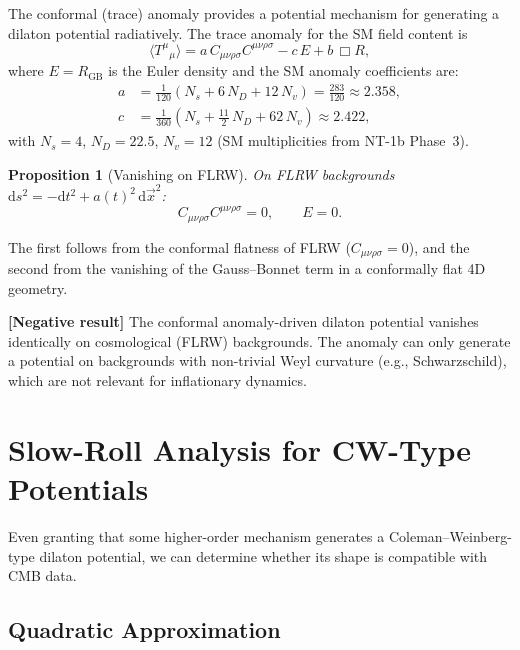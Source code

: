 \documentclass[11pt,a4paper]{article}
\newcommand{\Weylsq}{C_{\mu\nu\rho\sigma}C^{\mu\nu\rho\sigma}}
\renewcommand{\dd}{\mathrm{d}}
\theoremstyle{plain}
\newtheorem{proposition}[theorem]{Proposition}
\theoremstyle{definition}
\newcommand{\negresult}[1]{%
  \par\smallskip\noindent
  \colorbox{red!10}{\parbox{\dimexpr\linewidth-2\fboxsep}{%
    \textcolor{red!60!black}{\textbf{[Negative result]}} #1}}%
  \par\smallskip}
\begin{document}
The conformal (trace) anomaly provides a potential mechanism for
generating a dilaton potential radiatively.  The trace anomaly for the
SM field content is
\begin{equation}\label{eq:trace-anomaly}
  \langle T^\mu{}_\mu\rangle
  = a\,\Weylsq - c\,E + b\,\Box R,
\end{equation}
where $E = R_{\mathrm{GB}}$ is the Euler density and the SM anomaly
coefficients are:
\begin{align}
  a &= \frac{1}{120}(N_s + 6\,N_D + 12\,N_v)
  = \frac{283}{120} \approx 2.358,
  \label{eq:a-coeff}\\
  c &= \frac{1}{360}(N_s + \tfrac{11}{2}\,N_D + 62\,N_v)
  \approx 2.422,
  \label{eq:c-coeff}
\end{align}
with $N_s = 4$, $N_D = 22.5$, $N_v = 12$ (SM multiplicities from
NT-1b Phase~3).

\begin{proposition}[Vanishing on FLRW]\label{prop:FLRW-anomaly}
On FLRW backgrounds
$\dd s^2 = -\dd t^2 + a(t)^2\,\dd\vec{x}^2$:
\begin{equation}
  \Weylsq = 0, \qquad E = 0.
\end{equation}
\end{proposition}

The first follows from the conformal flatness of FLRW
($C_{\mu\nu\rho\sigma} = 0$), and the second from the vanishing of
the Gauss--Bonnet term in a conformally flat 4D geometry.

\negresult{The conformal anomaly-driven dilaton potential vanishes
identically on cosmological (FLRW) backgrounds.  The anomaly can
only generate a potential on backgrounds with non-trivial Weyl
curvature (e.g., Schwarzschild), which are not relevant for
inflationary dynamics.}

\section{Slow-Roll Analysis for CW-Type Potentials}\label{sec:slowroll}

Even granting that some higher-order mechanism generates a
Coleman--Weinberg-type dilaton potential, we can determine whether its
shape is compatible with CMB data.

\subsection{Quadratic Approximation}
\end{document}
